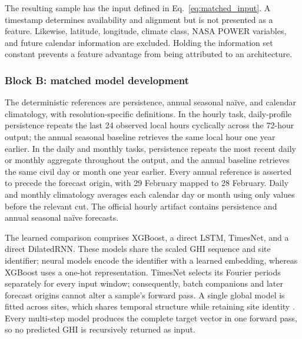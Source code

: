 The resulting sample has the input defined in Eq.~\eqref{eq:matched_input}.
A timestamp determines availability and alignment but is not presented as a
feature. Likewise, latitude, longitude, climate class, NASA POWER variables,
and future calendar information are excluded. Holding the information set
constant prevents a feature advantage from being attributed to an
architecture.

\subsubsection{Block B: matched model development}

The deterministic references are persistence, annual seasonal na\"ive, and
calendar climatology, with resolution-specific definitions. In the hourly
task, daily-profile persistence repeats the last 24 observed local hours
cyclically across the 72-hour output; the annual seasonal baseline retrieves the
same local hour one year earlier. In the daily and monthly tasks, persistence
repeats the most recent daily or monthly aggregate throughout the output, and
the annual baseline retrieves the same civil day or month one year earlier.
Every annual reference is asserted to precede the forecast origin, with
29 February mapped to 28 February. Daily and monthly climatology averages each
calendar day or month using only values before the relevant cut. The official
hourly artifact contains
persistence and annual seasonal na\"ive forecasts.

The learned comparison comprises XGBoost, a direct LSTM, TimesNet, and a direct
DilatedRNN. These models share the scaled GHI sequence and site identifier;
neural models encode the identifier with a learned embedding, whereas XGBoost
uses a one-hot representation. TimesNet selects its Fourier periods separately
for every input window; consequently, batch companions and later forecast
origins cannot alter a sample's forward pass. A single global model is fitted across sites,
which shares temporal structure while retaining site identity
\cite{montero2021}. Every multi-step model produces the complete target vector
in one forward pass, so no predicted GHI is recursively returned as input.

